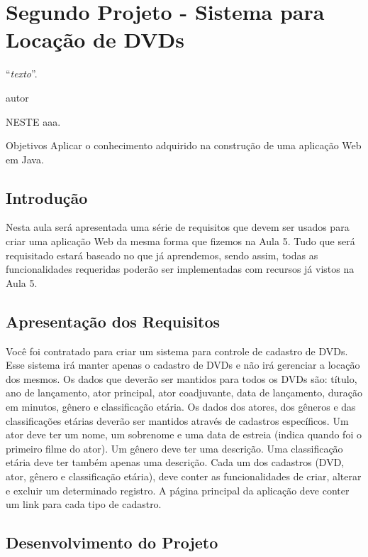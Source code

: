 \chapter{Segundo Projeto - Sistema para Locação de DVDs}
\epigraph{``\textit{texto}''.}{autor}

\lettrine[lines=4, lhang=0.1, lraise=0, loversize=0.2, findent=0.1em]{\textcolor{corAzulTema}{N}}{ESTE} aaa.

Objetivos
Aplicar o conhecimento adquirido na construção de uma aplicação Web em Java.


\section{Introdução}

Nesta aula será apresentada uma série de requisitos que devem ser usados para criar uma aplicação Web da mesma forma que fizemos na Aula 5. Tudo que será requisitado estará baseado no que já aprendemos, sendo assim, todas as funcionalidades requeridas poderão ser implementadas com recursos já vistos na Aula 5.


\section{Apresentação dos Requisitos}

Você foi contratado para criar um sistema para controle de cadastro de DVDs. Esse sistema irá manter apenas o cadastro de DVDs e não irá gerenciar a locação dos mesmos. Os dados que deverão ser mantidos para todos os DVDs são: título, ano de lançamento, ator principal, ator coadjuvante, data de lançamento, duração em minutos, gênero e classificação etária. Os dados dos atores, dos gêneros e das classificações etárias deverão ser mantidos através de cadastros específicos. Um ator deve ter um nome, um sobrenome e uma data de estreia (indica quando foi o primeiro filme do ator). Um gênero deve ter uma descrição. Uma classificação etária deve ter também apenas uma descrição. Cada um dos cadastros (DVD, ator, gênero e classificação etária), deve conter as funcionalidades de criar, alterar e excluir um determinado registro. A página principal da aplicação deve conter um link para cada tipo de cadastro.


\section{Desenvolvimento do Projeto}

